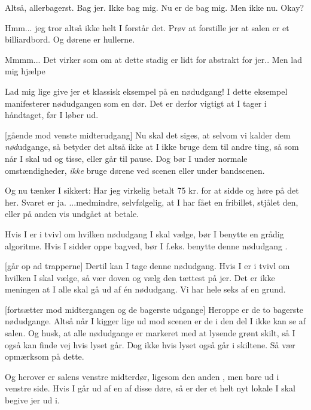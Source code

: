 \documentclass[a4paper,11pt]{article}
\begin{document}
\begin{sketch}
 Altså, allerbagerst. Bag jer.  Ikke bag mig.    Nu er de bag mig.  Men ikke nu.  Okay? 

 Hmm... jeg tror altså ikke helt I forstår det.  Prøv at forstille jer at salen er et billiardbord.  Og dørene er hullerne.  

 Mmmm... Det virker som om at dette stadig er lidt for abstrakt for jer.. Men lad mig hjælpe 

 Lad mig lige give jer et klassisk eksempel på en nødudgang!  I dette eksempel manifesterer nødudgangen som en dør. Det er derfor vigtigt at I tager i håndtaget, før I løber ud.

[gående mod venste midterudgang] Nu skal det siges, at selvom vi kalder dem \emph{nød}udgange, så betyder det altså ikke at I ikke bruge dem til andre ting, så som når I skal ud og tisse, eller går til pause.  Dog bør I under normale omstændigheder, \emph{ikke} bruge dørene ved scenen eller under bandscenen.

 Og nu tænker I sikkert: Har jeg virkelig betalt 75 kr. for at sidde og høre på det her. Svaret er ja. ...medmindre, selvfølgelig, at I har fået en fribillet, stjålet den, eller på anden vis undgået at betale.

 Hvis I er i tvivl om hvilken nødudgang I skal vælge, bør I benytte en grådig algoritme. Hvis I sidder oppe bagved, bør I f.eks. benytte denne nødudgang .





[går op ad trapperne] Dertil kan I tage denne nødudgang.  Hvis I er i tvivl om hvilken I skal vælge, så vær doven og vælg den tættest på jer.  Det er ikke meningen at I alle skal gå ud af én nødudgang.  Vi har hele seks af en grund.

[fortsætter mod midtergangen og de bagerste udgange] Heroppe er de to bagerste nødudgange.  Altså når I kigger lige ud mod scenen er de i den del I ikke kan se af salen.  Og husk, at alle nødudgange er markeret med at lysende grønt skilt, så I også kan finde vej hvis lyset går.  Dog ikke hvis lyset også går i skiltene.  Så vær opmærksom på dette.


 Og herover er salens venstre midterdør, ligesom den anden , men bare ud i venstre side.  Hvis I går ud af en af disse døre, så er der et helt nyt lokale I skal begive jer ud i.


\end{sketch}
\end{document}
